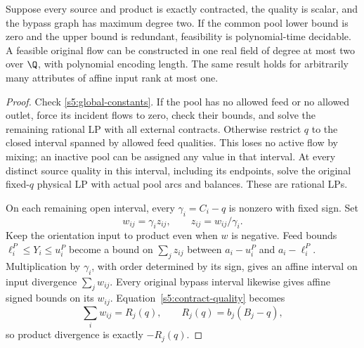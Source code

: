 \begin{theorem}\label{s5:quadratic-field}
Suppose every source and product is exactly contracted, the quality is
scalar, and the bypass graph has maximum degree two. If the common pool
lower bound is zero and the upper bound is redundant, feasibility is
polynomial-time decidable. A feasible original flow can be constructed
in one real field of degree at most two over $\Q$, with polynomial
encoding length. The same result holds for arbitrarily many attributes
of affine input rank at most one.
\end{theorem}
\begin{proof}
Check \eqref{s5:global-constants}. If the pool has no allowed feed or no
allowed outlet, force its incident flows to zero, check their bounds,
and solve the remaining rational LP with all external contracts. Otherwise
restrict $q$ to the closed interval spanned by allowed feed qualities.
This loses no active flow by mixing; an inactive pool can be assigned
any value in that interval. At every distinct source quality in this
interval, including its endpoints, solve the original fixed-$q$ physical
LP with actual pool arcs and balances. These are rational LPs.

On each remaining open interval, every $\gamma_i=C_i-q$ is nonzero
with fixed sign. Set
\begin{equation}
 w_{ij}=\gamma_i z_{ij},\qquad z_{ij}=w_{ij}/\gamma_i.
 \label{s5:scaling}
\end{equation}
Keep the orientation input to product even when $w$ is negative. Feed
bounds $\ell_i^P\le Y_i\le u_i^P$ become a bound on
$\sum_jz_{ij}$ between $a_i-u_i^P$ and $a_i-\ell_i^P$. Multiplication
by $\gamma_i$, with order determined by its sign, gives an affine
interval on input divergence $\sum_jw_{ij}$. Every original bypass
interval likewise gives affine signed bounds on its $w_{ij}$.
Equation~\eqref{s5:contract-quality} becomes
\begin{equation}
 \sum_i w_{ij}=R_j(q),\qquad R_j(q)=b_j(B_j-q),
 \label{s5:output-divergence}
\end{equation}
so product divergence is exactly $-R_j(q)$.


\end{proof}
